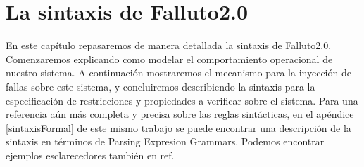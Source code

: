 \documentclass[titlepage, 12pt]{book}
\begin{document}


\chapter{La sintaxis de Falluto2.0}
\label{sintaxisDeFalluto}

En este cap\'itulo repasaremos de manera detallada la sintaxis de Falluto2.0. Comenzaremos explicando como modelar el comportamiento operacional de nuestro sistema. A continuaci\'on mostraremos el mecanismo para la inyecci\'on de fallas sobre este sistema, y concluiremos describiendo la sintaxis para la especificaci\'on de restricciones y propiedades a verificar sobre el sistema. Para una referencia a\'un m\'as completa y precisa sobre las reglas sint\'acticas, en el ap\'endice \ref{sintaxisFormal} de este mismo trabajo se puede encontrar una descripci\'on de la sintaxis en t\'erminos de Parsing Expresion Grammars. Podemos encontrar ejemplos esclarecedores tambi\'en en ref{}.
\end{document}
